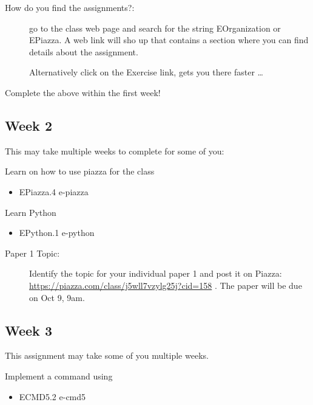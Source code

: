 \begin{description}
\item[How do you find the assignments?:]
go to the class web page and search for the string EOrganization or
EPiazza. A web link will sho up that contains a section where you can
find details about the assignment.

Alternatively click on the Exercise link, gets you there faster \ldots{}
\end{description}

Complete the above within the first week!

\subsection{Week 2}\label{week-2}

This may take multiple weeks to complete for some of you:

Learn on how to use piazza for the class

\begin{itemize}

\item
  EPiazza.4 e-piazza
\end{itemize}

Learn Python

\begin{itemize}

\item
  EPython.1 e-python
\end{itemize}

\begin{description}
\item[Paper 1 Topic:]
Identify the topic for your individual paper 1 and post it on Piazza:
\url{https://piazza.com/class/j5wll7vzylg25j?cid=158} . The paper will
be due on Oct 9, 9am.
\end{description}

\subsection{Week 3}\label{week-3}

This assignment may take some of you multiple weeks.

Implement a command using

\begin{itemize}

\item
  ECMD5.2 e-cmd5
\end{itemize}


